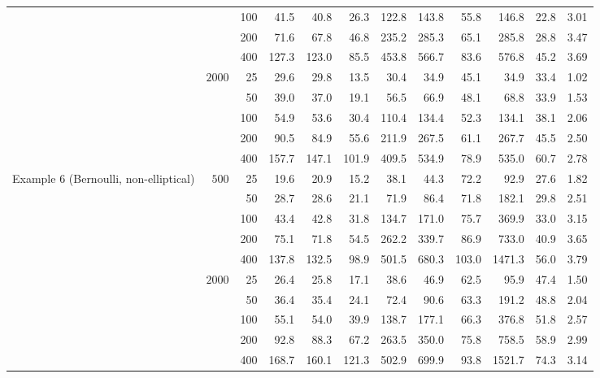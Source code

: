 \begin{tabular}{lrrrrrrrrrrr}
 &  & 100 & 41.5 & 40.8 & 26.3 & 122.8 & 143.8 & 55.8 & 146.8 & 22.8 & 3.01\\
 &  & 200 & 71.6 & 67.8 & 46.8 & 235.2 & 285.3 & 65.1 & 285.8 & 28.8 & 3.47\\
 &  & 400 & 127.3 & 123.0 & 85.5 & 453.8 & 566.7 & 83.6 & 576.8 & 45.2 & 3.69\\
 & $2000$ & 25 & 29.6 & 29.8 & 13.5 & 30.4 & 34.9 & 45.1 & 34.9 & 33.4 & 1.02\\
 &  & 50 & 39.0 & 37.0 & 19.1 & 56.5 & 66.9 & 48.1 & 68.8 & 33.9 & 1.53\\
 &  & 100 & 54.9 & 53.6 & 30.4 & 110.4 & 134.4 & 52.3 & 134.1 & 38.1 & 2.06\\
 &  & 200 & 90.5 & 84.9 & 55.6 & 211.9 & 267.5 & 61.1 & 267.7 & 45.5 & 2.50\\
 &  & 400 & 157.7 & 147.1 & 101.9 & 409.5 & 534.9 & 78.9 & 535.0 & 60.7 & 2.78\\
\addlinespace
Example 6 (Bernoulli, non-elliptical) & $500$ & 25 & 19.6 & 20.9 & 15.2 & 38.1 & 44.3 & 72.2 & 92.9 & 27.6 & 1.82\\
 &  & 50 & 28.7 & 28.6 & 21.1 & 71.9 & 86.4 & 71.8 & 182.1 & 29.8 & 2.51\\
 &  & 100 & 43.4 & 42.8 & 31.8 & 134.7 & 171.0 & 75.7 & 369.9 & 33.0 & 3.15\\
 &  & 200 & 75.1 & 71.8 & 54.5 & 262.2 & 339.7 & 86.9 & 733.0 & 40.9 & 3.65\\
 &  & 400 & 137.8 & 132.5 & 98.9 & 501.5 & 680.3 & 103.0 & 1471.3 & 56.0 & 3.79\\
 & $2000$ & 25 & 26.4 & 25.8 & 17.1 & 38.6 & 46.9 & 62.5 & 95.9 & 47.4 & 1.50\\
 &  & 50 & 36.4 & 35.4 & 24.1 & 72.4 & 90.6 & 63.3 & 191.2 & 48.8 & 2.04\\
 &  & 100 & 55.1 & 54.0 & 39.9 & 138.7 & 177.1 & 66.3 & 376.8 & 51.8 & 2.57\\
 &  & 200 & 92.8 & 88.3 & 67.2 & 263.5 & 350.0 & 75.8 & 758.5 & 58.9 & 2.99\\
 &  & 400 & 168.7 & 160.1 & 121.3 & 502.9 & 699.9 & 93.8 & 1521.7 & 74.3 & 3.14\\
\bottomrule
\end{tabular}
